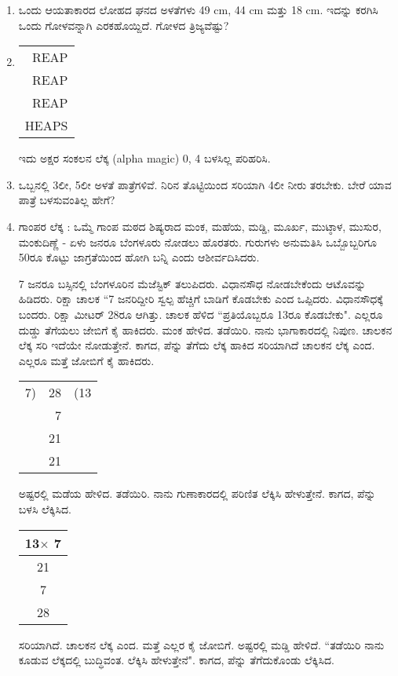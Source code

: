\begin{enumerate}
\item ಒಂದು ಆಯತಾಕಾರದ ಲೋಹದ ಘನದ ಅಳತೆಗಳು 49 cm, 44 cm ಮತ್ತು 18 cm. ಇದನ್ನು ಕರಗಿಸಿ ಒಂದು ಗೋಳವನ್ನಾಗಿ ಎರಕಹೊಯ್ದಿದೆ. ಗೋಳದ ತ್ರಿಜ್ಯವೆಷ್ಟು? 

\item 
\begin{tabular}[t]{r}
REAP\\
REAP\\
REAP\\
\hline
HEAPS
\end{tabular}

ಇದು ಅಕ್ಷರ ಸಂಕಲನ ಲೆಕ್ಕ (alpha magic) 0, 4 ಬಳಸಿಲ್ಲ ಪರಿಹರಿಸಿ. 

\item ಒಬ್ಬನಲ್ಲಿ 3ಲೀ, 5ಲೀ ಅಳತೆ ಪಾತ್ರೆಗಳಿವೆ. ನಿರಿನ ತೊಟ್ಟಿಯಿಂದ ಸರಿಯಾಗಿ 4ಲೀ ನೀರು ತರಬೇಕು. ಬೇರೆ ಯಾವ ಪಾತ್ರೆ ಬಳಸುವಂತಿಲ್ಲ ಹೇಗೆ?  

\item ಗಾಂಪರ ಲೆಕ್ಕ : ಒಮ್ಮೆ ಗಾಂಪ ಮಠದ ಶಿಷ್ಯರಾದ ಮಂಕ, ಮಹೆಯ, ಮಡ್ಡಿ, ಮೂರ್ಖ, ಮುಟ್ಠಾಳ, ಮುಸುರ, ಮಂಕುದಿಣ್ಣೆ  - ಏಳು ಜನರೂ ಬೆಂಗಳೂರು ನೋಡಲು ಹೊರತರು. ಗುರುಗಳು ಅನುಮತಿಸಿ ಒಬ್ಬೊಬ್ಬರಿಗೂ 50ರೂ ಕೊಟ್ಟು ಜಾಗ್ರತೆಯಿಂದ ಹೋಗಿ ಬನ್ನಿ ಎಂದು ಆಶೀರ್ವದಿಸಿದರು. 

7 ಜನರೂ ಬಸ್ಸಿನಲ್ಲಿ ಬೆಂಗಳೂರಿನ ಮೆಜೆಸ್ಟಿಕ್ ತಲುಪಿದರು. ವಿಧಾನಸೌಧ ನೋಡಬೇಕೆಂದು ಆಟೊವನ್ನು ಹಿಡಿದರು. ರಿಕ್ಷಾ ಚಾಲಕ ``7 ಜನರಿದ್ದೀರಿ ಸ್ವಲ್ಪ ಹೆಚ್ಚಿಗೆ ಬಾಡಿಗೆ ಕೊಡಬೇಕು ಎಂದ ಒಪ್ಪಿದರು. ವಿಧಾನಸೌಧಕ್ಕೆ ಬಂದರು. ರಿಕ್ಷಾ ಮೀಟರ್ 28ರೂ ಆಗಿತ್ತು. ಚಾಲಕ ಹೆಳಿದ ``ಪ್ರತಿಯೊಬ್ಬರೂ 13ರೂ ಕೊಡಬೇಕು". ಎಲ್ಲರೂ ದುಡ್ಡು ತೆಗೆಯಲು ಜೇಬಿಗೆ ಕೈ ಹಾಕಿದರು. ಮಂಕ ಹೇಳಿದ. ತಡೆಯಿರಿ. ನಾನು ಭಾಗಾಕಾರದಲ್ಲಿ ನಿಪುಣ. ಚಾಲಕನ ಲೆಕ್ಕ ಸರಿ ಇದೆಯೇ ನೋಡುತ್ತೇನೆ. ಕಾಗದ, ಪೆನ್ನು ತೆಗೆದು ಲೆಕ್ಕ ಹಾಕಿದ ಸರಿಯಾಗಿದೆ ಚಾಲಕನ ಲೆಕ್ಕ ಎಂದ. ಎಲ್ಲರೂ ಮತ್ತೆ ಜೋಬಿಗೆ  ಕೈ ಹಾಕಿದರು. 

\begin{tabular}[t]{l@{\;}r@{\;}l}
7)& 28& (13\\
& 7 & \\
\hline
& 21& \\
& 21 &\\
\hline
\end{tabular}

ಅಷ್ಟರಲ್ಲಿ ಮಡೆಯ ಹೇಳಿದ. ತಡೆಯಿರಿ. ನಾನು ಗುಣಾಕಾರದಲ್ಲಿ ಪರಿಣಿತ ಲೆಕ್ಕಿಸಿ ಹೇಳುತ್ತೇನೆ. ಕಾಗದ, ಪೆನ್ನು ಬಳಸಿ ಲೆಕ್ಕಿಸಿದ. 

\begin{tabular}[t]{c}
13$\times$ 7\\
\hline
21\\
7\\
\hline
28\\
\hline
\end{tabular}

ಸರಿಯಾಗಿದೆ. ಚಾಲಕನ ಲೆಕ್ಕ ಎಂದ. ಮತ್ತೆ ಎಲ್ಲರ ಕೈ ಜೋಬಿಗೆ. ಅಷ್ಟರಲ್ಲಿ ಮಡ್ಡಿ ಹೇಳಿದೆ. ``ತಡೆಯಿರಿ ನಾನು ಕೂಡುವ ಲೆಕ್ಕದಲ್ಲಿ ಬುದ್ಧಿವಂತ. ಲೆಕ್ಕಿಸಿ ಹೇಳುತ್ತೇನೆ". ಕಾಗದ, ಪೆನ್ನು ತೆಗೆದುಕೊಂಡು ಲೆಕ್ಕಿಸಿದ. 


\end{enumerate}

